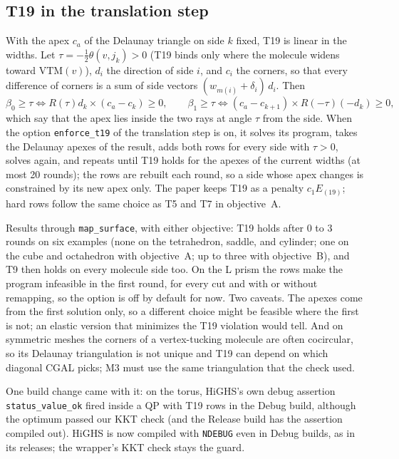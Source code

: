 \documentclass[11pt]{article}
\newcommand{\VTM}{\mathrm{VTM}}
\theoremstyle{definition}
\begin{document}
\subsection{T19 in the translation step}

With the apex $c_a$ of the Delaunay triangle on side $k$ fixed, T19 is linear
in the widths. Let $\tau = -\frac12\theta(v,j_k) > 0$ (T19 binds only where
the molecule widens toward $\VTM(v)$), $d_i$ the direction of side $i$, and
$c_i$ the corners, so that every difference of corners is a sum of side
vectors $(w_{m(i)} + \delta_i)\,d_i$. Then
\[
  \beta_0 \ge \tau \iff
  R(\tau)d_k \times (c_a - c_k) \ge 0, \qquad
  \beta_1 \ge \tau \iff
  (c_a - c_{k+1}) \times R(-\tau)(-d_k) \ge 0,
\]
which say that the apex lies inside the two rays at angle $\tau$ from the
side. When the option \texttt{enforce\_t19} of the translation step is on, it
solves its program, takes the Delaunay apexes of the result, adds both rows
for every side with $\tau > 0$, solves again, and repeats until T19 holds
for the apexes of the current widths (at most 20 rounds); the rows are
rebuilt each round, so a side whose apex changes is constrained by its new
apex only. The paper keeps T19 as a penalty $c_1E_{(19)}$; hard rows follow
the same choice as T5 and T7 in objective~A.

Results through \texttt{map\_surface}, with either objective: T19 holds after
0 to 3 rounds on six examples (none on the tetrahedron, saddle, and cylinder;
one on the cube and octahedron with objective~A; up to three with
objective~B), and T9 then holds on every molecule side too. On the L prism
the rows make the program infeasible in the first round, for every cut and
with or without remapping, so the option is off by default for now. Two
caveats. The apexes come from the first solution only, so a different choice
might be feasible where the first is not; an elastic version that minimizes
the T19 violation would tell. And on symmetric meshes the corners of a
vertex-tucking molecule are often cocircular, so its Delaunay triangulation
is not unique and T19 can depend on which diagonal CGAL picks; M3 must use
the same triangulation that the check used.

One build change came with it: on the torus, HiGHS's own debug assertion
\texttt{status\_value\_ok} fired inside a QP with T19 rows in the Debug build,
although the optimum passed our KKT check (and the Release build has the
assertion compiled out). HiGHS is now compiled with \texttt{NDEBUG} even in
Debug builds, as in its releases; the wrapper's KKT check stays the guard.
\end{document}
